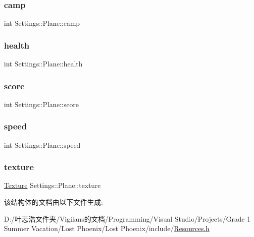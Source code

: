 \subsubsection{\texorpdfstring{camp}{camp}}
{\footnotesize\ttfamily int Settings\+::\+Plane\+::camp}

\mbox{\label{struct_settings_1_1_plane_a71ffa9166855277d353d0fb6ac8f58f6}} 
\subsubsection{\texorpdfstring{health}{health}}
{\footnotesize\ttfamily int Settings\+::\+Plane\+::health}

\mbox{\label{struct_settings_1_1_plane_a20a8861d723406f4d49610804226dd82}} 
\subsubsection{\texorpdfstring{score}{score}}
{\footnotesize\ttfamily int Settings\+::\+Plane\+::score}

\mbox{\label{struct_settings_1_1_plane_a814ee5fe2c6b873ff4f0e0208f2c240a}} 
\subsubsection{\texorpdfstring{speed}{speed}}
{\footnotesize\ttfamily int Settings\+::\+Plane\+::speed}

\mbox{\label{struct_settings_1_1_plane_a6a000124604eb5435f4d77bbec170a4f}} 
\subsubsection{\texorpdfstring{texture}{texture}}
{\footnotesize\ttfamily \hyperlink{struct_texture}{Texture} Settings\+::\+Plane\+::texture}



该结构体的文档由以下文件生成\+:\begin{DoxyCompactItemize}
\item 
D\+:/叶志浩文件夹/\+Vigilans的文档/\+Programming/\+Visual Studio/\+Projects/\+Grade 1 Summer Vacation/\+Lost Phoenix/\+Lost Phoenix/include/\hyperlink{_resources_8h}{Resources.\+h}\end{DoxyCompactItemize}
